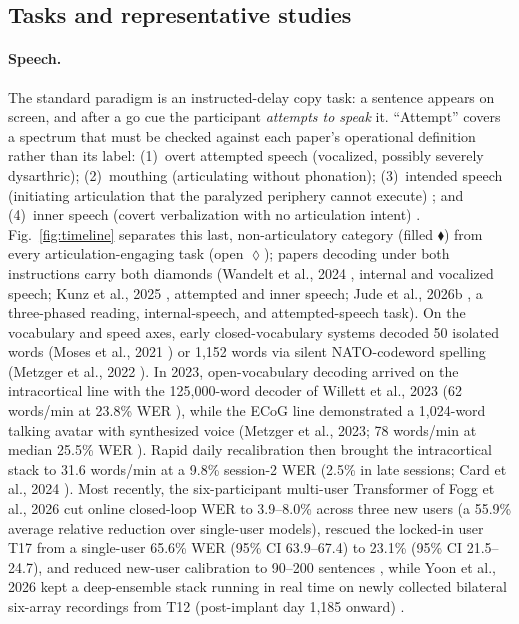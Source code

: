 \documentclass[11pt]{article}
\newcommand{\wpm}{words/min}
\begin{document}
\subsection{Tasks and representative studies}
\label{sec:defs}

\paragraph{Speech.} The standard paradigm is an instructed-delay copy
task: a sentence appears on screen, and after a go cue the participant
\emph{attempts to speak} it. ``Attempt'' covers a spectrum that must be
checked against each paper's operational definition rather than its
label: (1)~overt attempted speech (vocalized, possibly severely
dysarthric); (2)~mouthing (articulating without phonation);
(3)~intended speech (initiating articulation that the paralyzed
periphery cannot execute) \cite{metzger2023}; and (4)~inner speech
(covert verbalization with no articulation intent) \cite{kunz2025}.
Fig.~\ref{fig:timeline} separates this last, non-articulatory category
(filled $\blacklozenge$) from every articulation-engaging task (open
$\lozenge$); papers decoding under both instructions carry both
diamonds (Wandelt et al., 2024 \cite{wandelt2024}, internal and
vocalized speech; Kunz et al., 2025 \cite{kunz2025}, attempted and
inner speech; Jude et al., 2026b \cite{jude2026lis}, a three-phased
reading, internal-speech, and attempted-speech task).
On the vocabulary and speed axes, early closed-vocabulary systems
decoded 50 isolated words (Moses et al., 2021 \cite{moses2021}) or
1{,}152 words via silent NATO-codeword spelling (Metzger et al., 2022
\cite{metzger2022}). In 2023, open-vocabulary decoding arrived on the
intracortical line with the 125{,}000-word decoder of Willett et al.,
2023 (62 \wpm{} at 23.8\% WER \cite{willett2023}), while the ECoG line
demonstrated a 1{,}024-word talking avatar with synthesized voice
(Metzger et al., 2023; 78 \wpm{} at median 25.5\% WER
\cite{metzger2023}). Rapid daily recalibration then brought the
intracortical stack to 31.6 \wpm{} at a 9.8\% session-2 WER (2.5\% in
late sessions; Card et al., 2024 \cite{card2024}). Most recently, the
six-participant multi-user Transformer of Fogg et al., 2026 cut online
closed-loop WER to 3.9--8.0\% across three new users (a 55.9\% average
relative reduction over single-user models), rescued the locked-in user
T17 from a single-user 65.6\% WER (95\% CI 63.9--67.4) to 23.1\% (95\%
CI 21.5--24.7), and reduced new-user calibration to 90--200 sentences
\cite{fogg2026}, while Yoon et al., 2026 kept a deep-ensemble stack
running in real time on newly collected bilateral six-array recordings
from T12 (post-implant day 1{,}185 onward) \cite{yoon2026}.
\end{document}
